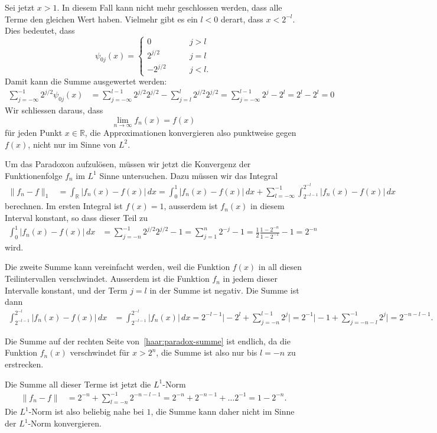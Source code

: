 Sei jetzt $x>1$.
In diesem Fall kann nicht mehr geschlossen werden, dass alle Terme den
gleichen Wert haben.
Vielmehr gibt es ein $l<0$ derart, dass $x < 2^{-l}$.
Dies bedeutet, dass
\[
\psi_{0j}(x)
=
\begin{cases}
0&\qquad j>l\\
2^{j/2}&\qquad j = l
\\
-2^{j/2}&\qquad j < l.
\end{cases}
\]
Damit kann die Summe ausgewertet werden:
\begin{align*}
\sum_{j=-\infty}^{-1} 2^{j/2} \psi_{0j}(x)
&=
\sum_{j=-\infty}^{l-1} 2^{j/2} 2^{j/2}
-
\sum_{j=l}^{l} 2^{j/2} 2^{j/2}
=
\sum_{j=-\infty}^{l-1} 2^j
-
2^l
=
2^l
-
2^l
=
0
\end{align*}
Wir schliessen daraus, dass 
\[
\lim_{n\to\infty} f_n(x) = f(x)
\]
für jeden Punkt $x\in\mathbb R$, die Approximationen konvergieren also
punktweise gegen $f(x)$, nicht nur im Sinne von $L^2$.

Um das Paradoxon aufzulösen, müssen wir jetzt die Konvergenz der
Funktionenfolge $f_n$ im $L^1$ Sinne untersuchen.
Dazu müssen wir das Integral
\begin{align}
\| f_n-f\|_1
&=
\int_{\mathbb R} |f_n(x) - f(x)| \,dx
=
\int_0^1 |f_n(x) - f(x)|\,dx
+
\sum_{l=-\infty}^{-1}
\int_{2^{-l-1}}^{2^{-l}} |f_n(x)-f(x)|\,dx
\label{haar:paradox-summe}
\end{align}
berechnen.
Im ersten Integral ist $f(x)=1$, ausserdem ist $f_n(x)$ in diesem Interval
konstant, so dass dieser Teil zu
\begin{align*}
\int_0^1 |f_n(x) - f(x)|\,dx
&=
\sum_{j=-n}^{-1} 2^{j/2} 2^{j/2} - 1
=
\sum_{j=1}^{n} 2^{-j} - 1
=
\frac12
\frac{1-2^{-n}}{1-2^{-1}}-1
=
2^{-n}
\end{align*}
wird.

Die zweite Summe kann vereinfacht werden, weil die Funktion $f(x)$ in all
diesen Teilintervallen verschwindet.
Ausserdem ist die Funktion $f_n$ in jedem dieser Intervalle konstant,
und der Term $j=l$ in der Summe ist negativ.
Die Summe ist dann
\begin{align*}
\int_{2^{-l-1}}^{2^{-l}} |f_n(x)-f(x)|\,dx
&=
\int_{2^{-l-1}}^{2^{-l}} |f_n(x)|\,dx
=
2^{-l-1} 
\biggl|
-2^{l}
+
\sum_{j=-n}^{l-1}  2^{j}
\biggr|
=
2^{-1} 
\biggl|
-1
+
\sum_{j=-n-l}^{-1}  2^{j}
\biggr|
=
2^{-n-l-1}.
\end{align*}

Die Summe auf der rechten Seite von~\eqref{haar:paradox-summe} ist
endlich, da die Funktion $f_n(x)$ verschwindet für $x>2^n$, die Summe
ist also nur bis $l=-n$ zu erstrecken.

Die Summe all dieser Terme ist jetzt die $L^1$-Norm
\begin{align*}
\|f_n - f\|
&=
2^{-n} + \sum_{l=-n}^{-1} 2^{-n-l-1}
=
2^{-n} + 2^{-n-1} + \dots 2^{-1}
=
1- 2^{-n}.
\end{align*}
Die $L^1$-Norm ist also beliebig nahe bei $1$, die Summe kann daher
nicht im Sinne der $L^1$-Norm konvergieren.

